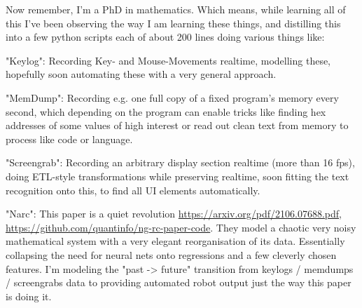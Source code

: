 \documentclass[a4paper]{twentysecondcv} %
\begin{document}
Now remember, I'm a PhD in mathematics. Which means, while learning all of this I've been observing the way I am learning these
things, and distilling this into a few python scripts each of about 200 lines doing various things like:

"Keylog": Recording Key- and Mouse-Movements realtime, modelling these, hopefully soon automating these with a very general approach.

"MemDump": Recording e.g. one full copy of a fixed program's memory every second, which depending on the program can enable tricks
like finding hex addresses of some values of high interest or read out clean text from memory to process like code or language.

"Screengrab": Recording an arbitrary display section realtime (more than 16 fps), doing ETL-style transformations while preserving realtime,
soon fitting the text recognition onto this, to find all UI elements automatically.

"Narc": This paper is a quiet revolution \href{https://arxiv.org/pdf/2106.07688.pdf}{https://arxiv.org/pdf/2106.07688.pdf}, 
\href{https://github.com/quantinfo/ng-rc-paper-code}{https://github.com/quantinfo/ng-rc-paper-code}. They model a 
chaotic very noisy mathematical system with a very elegant reorganisation of its data. Essentially collapsing the need for neural nets onto
regressions and a few cleverly chosen features. I'm modeling the "past -> future" transition from keylogs / memdumps / screengrabs data to providing automated robot output just the way this paper is doing it. 
\end{document}
